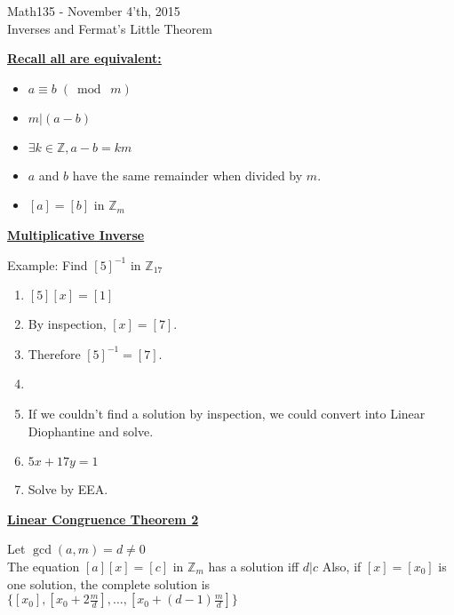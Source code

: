 \documentclass{letter}
\begin{document}
	\begin{center}
		\LARGE Math135 - November 4'th, 2015\\
		\large Inverses and Fermat's Little Theorem
	\end{center}
	\vspace{0.25 in}
	\underline{\textbf{Recall all are equivalent:}}
	
	\begin{itemize}
		\item $a \equiv b\;(\bmod\; m)$
		\item $m \vert (a-b)$
		\item $\exists k \in \mathbb{Z}, a-b = km$
		\item $a$ and $b$ have the same remainder when divided by $m$.
		\item $[a] = [b]$ in $\mathbb{Z}_m$
	\end{itemize}
	
	\underline{\textbf{Multiplicative Inverse}}
	
	Example: Find $[5]^{-1}$ in $\mathbb{Z}_{17}$
	
	\begin{enumerate}[ ]
		\item $[5][x] = [1]$
		\item By inspection, $[x] = [7]$.
		\item Therefore $[5]^{-1} = [7]$.
		\item 
		\item If we couldn't find a solution by inspection, we could convert into Linear Diophantine and solve.
		\item $5x + 17y = 1$
		\item Solve by EEA.
	\end{enumerate}
	
	\underline{\textbf{Linear Congruence Theorem 2}}
	
	Let $\gcd(a, m) = d \not= 0$\\
	The equation $[a][x] = [c]$ in $\mathbb{Z}_m$ has a solution iff $d\vert c$ Also, if $[x] = [x_0]$ is one solution, the complete solution is\\
	$\lbrace[x_0], [x_0 + 2\frac{m}{d}], \dots , [x_0 + (d-1)\frac{m}{d}]\rbrace$\\
	
\end{document}
